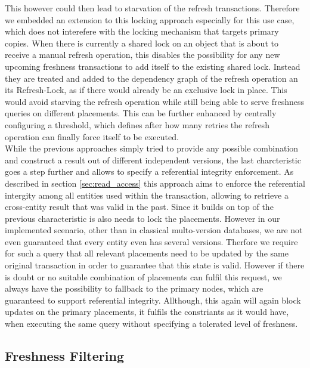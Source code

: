 This however could then lead to starvation of the refresh transactions. 
Therefore we embedded an extension to this locking approach especially for this use case, which does not interefere with 
the locking mechanism that targets primary copies. When there is currently a shared lock on an object that is about to receive a manual refresh operation, 
this disables the possibility for any new upcoming freshness transactions to add itself to the existing shared lock. Instead they are treated and added to the dependency graph 
of the refresh operation an its Refresh-Lock, as if there would already be an exclusive lock in place. 
This would avoid starving the refresh operation while still being able to serve freshness queries on different placements.
This can be further enhanced by centrally configuring  a threshold, which defines after how many retries the refresh operation can finally force itself 
to be executed.\\
While the previous approaches simply tried to provide any possible combination
and construct a result out of different independent versions, the last charcteristic goes a step further and allows to specify a referential integrity enforcement. 
As described in section \ref{sec:read_access} this approach aims to enforce the referential intergity among all entities used within the transaction, 
allowing to retrieve a cross-entity result that was valid in the past. Since it builds on top of the previous characteristic is also needs to lock the placements. 
However in our implemented scenario, other than in classical multo-version databases, we are not even guaranteed that every entity even has several versions. 
Therfore we require for such a query that all relevant placements need to be updated by the same original transaction in order to guarantee that this state is valid.
However if there is doubt or no suitable combination of placements can fulfil this request,
we always have the possibility to fallback to the primary nodes, which are guaranteed to support referential integrity.
Allthough, this again will again block updates on the primary placements, it fulfils the constriants as it would have, when executing the same query without specifying a tolerated level of freshness.






\subsection{Freshness Filtering}
\label{sec:fresh_filter} 

